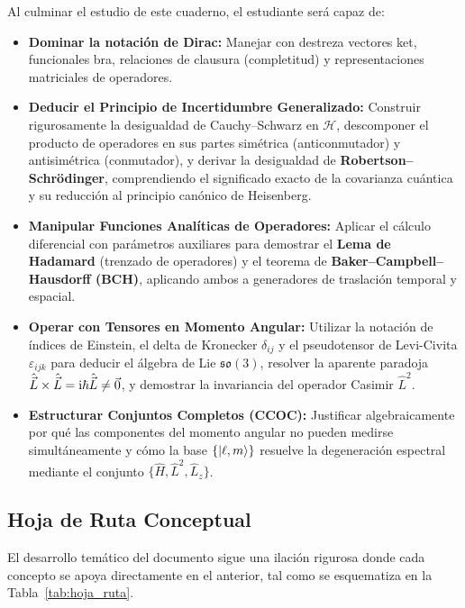 Al culminar el estudio de este cuaderno, el estudiante será capaz de:
\begin{itemize}
    \item \textbf{Dominar la notación de Dirac:} Manejar con destreza vectores ket, funcionales bra, relaciones de clausura (completitud) y representaciones matriciales de operadores.
    \item \textbf{Deducir el Principio de Incertidumbre Generalizado:} Construir rigurosamente la desigualdad de Cauchy--Schwarz en $\mathcal{H}$, descomponer el producto de operadores en sus partes simétrica (anticonmutador) y antisimétrica (conmutador), y derivar la desigualdad de \textbf{Robertson--Schrödinger}, comprendiendo el significado exacto de la covarianza cuántica y su reducción al principio canónico de Heisenberg.
    \item \textbf{Manipular Funciones Analíticas de Operadores:} Aplicar el cálculo diferencial con parámetros auxiliares para demostrar el \textbf{Lema de Hadamard} (trenzado de operadores) y el teorema de \textbf{Baker--Campbell--Hausdorff (BCH)}, aplicando ambos a generadores de traslación temporal y espacial.
    \item \textbf{Operar con Tensores en Momento Angular:} Utilizar la notación de índices de Einstein, el delta de Kronecker $\delta_{ij}$ y el pseudotensor de Levi-Civita $\varepsilon_{ijk}$ para deducir el álgebra de Lie $\mathfrak{so}(3)$, resolver la aparente paradoja $\hat{\vec{L}} \times \hat{\vec{L}} = \mathrm{i}\hbar\hat{\vec{L}} \neq \vec{0}$, y demostrar la invariancia del operador Casimir $\hat{L}^2$.
    \item \textbf{Estructurar Conjuntos Completos (CCOC):} Justificar algebraicamente por qué las componentes del momento angular no pueden medirse simultáneamente y cómo la base $\{ \left| \ell, m \right\rangle \}$ resuelve la degeneración espectral mediante el conjunto $\{\hat{H}, \hat{L}^2, \hat{L}_z\}$.
\end{itemize}

\subsection{Hoja de Ruta Conceptual}

El desarrollo temático del documento sigue una ilación rigurosa donde cada concepto se apoya directamente en el anterior, tal como se esquematiza en la Tabla~\ref{tab:hoja_ruta}.

